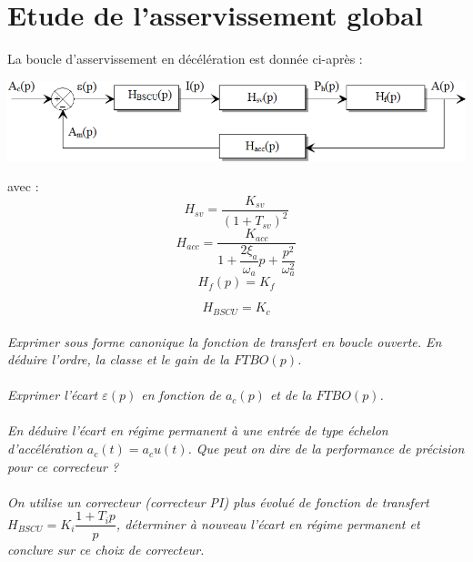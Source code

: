 \documentclass[10pt,oneside]{article}
\begin{document}
\section{Etude de l'asservissement global}
La boucle d'asservissement en décélération est donnée ci-après :

\begin{center}
\includegraphics[width=.8\textwidth]{png/image16.png}
\end{center}

avec : 
$$
H_{sv}=\dfrac{K_{sv}}{\left(1+T_{sv} \right)^2}
$$
$$
H_{acc}=\dfrac{K_{acc}}{1+\dfrac{2\xi_a }{\omega_a}p+\dfrac{p^2}{\omega_a^2}}
$$
$$
H_f(p)=K_f
$$

$$
H_{BSCU}=K_c
$$
\paragraph{}
\textit{Exprimer sous forme canonique la fonction de transfert en boucle ouverte. En déduire
l’ordre, la classe et le gain de la $FTBO(p)$.}

\paragraph{}
\textit{Exprimer l'écart $\varepsilon(p)$ en fonction de $a_c(p)$ et de la $FTBO(p)$.}

\paragraph{}
\textit{En déduire l'écart en régime permanent à une entrée de type échelon d'accélération
$a_c (t)=a_cu (t)$. Que peut on dire de la performance de précision pour ce correcteur ?}

\paragraph{}
\textit{On utilise un correcteur (correcteur PI) plus évolué de fonction de transfert
$H_{BSCU}=K_i\dfrac{1+T_i p}{p}$, déterminer à nouveau l'écart en régime permanent et conclure sur ce choix de correcteur.}
\end{document}
